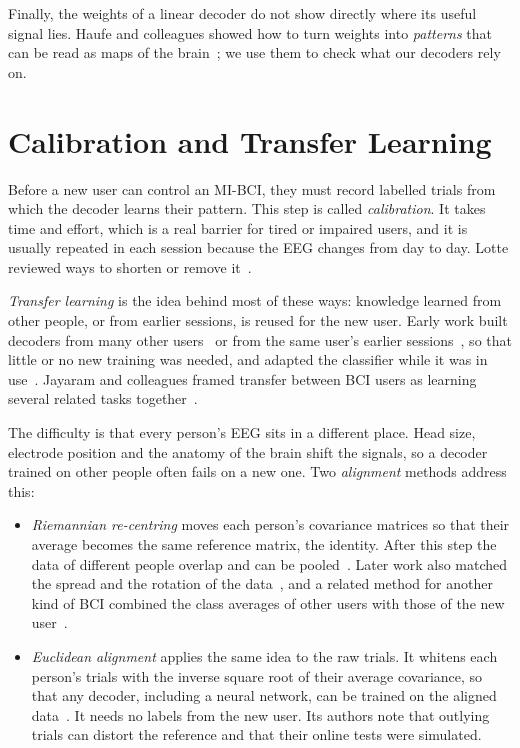 Finally, the weights of a linear decoder do not show directly where its useful signal lies.
Haufe and colleagues showed how to turn weights into \emph{patterns} that can be read as maps
of the brain~\cite{haufe2014}; we use them to check what our decoders rely on.

\section{Calibration and Transfer Learning}\label{sec:lit-transfer}

Before a new user can control an MI-BCI, they must record labelled trials from which the
decoder learns their pattern. This step is called \emph{calibration}. It takes time and
effort, which is a real barrier for tired or impaired users, and it is usually repeated in
each session because the EEG changes from day to day. Lotte reviewed ways to shorten or
remove it~\cite{lotte2015}.

\emph{Transfer learning} is the idea behind most of these ways: knowledge learned from other
people, or from earlier sessions, is reused for the new user. Early work built decoders from
many other users~\cite{fazli2009} or from the same user's earlier
sessions~\cite{krauledat2008}, so that little or no new training was needed, and adapted
the classifier while it was in use~\cite{shenoy2006}. Jayaram and colleagues framed transfer
between BCI users as learning several related tasks together~\cite{jayaram2016}.

The difficulty is that every person's EEG sits in a different place. Head size, electrode
position and the anatomy of the brain shift the signals, so a decoder trained on other
people often fails on a new one. Two \emph{alignment} methods address this:

\begin{itemize}
  \item \emph{Riemannian re-centring} moves each person's covariance matrices so that their
        average becomes the same reference matrix, the identity. After this step the data of
        different people overlap and can be pooled~\cite{zanini2018}. Later work also matched
        the spread and the rotation of the data~\cite{rodrigues2019}, and a related method for
        another kind of BCI combined the class averages of other users with those of the new
        user~\cite{kalunga2018}.
  \item \emph{Euclidean alignment} applies the same idea to the raw trials. It whitens each
        person's trials with the inverse square root of their average covariance, so that any
        decoder, including a neural network, can be trained on the aligned
        data~\cite{he2020}. It needs no labels from the new user. Its authors note that
        outlying trials can distort the reference and that their online tests were
        simulated.
\end{itemize}

